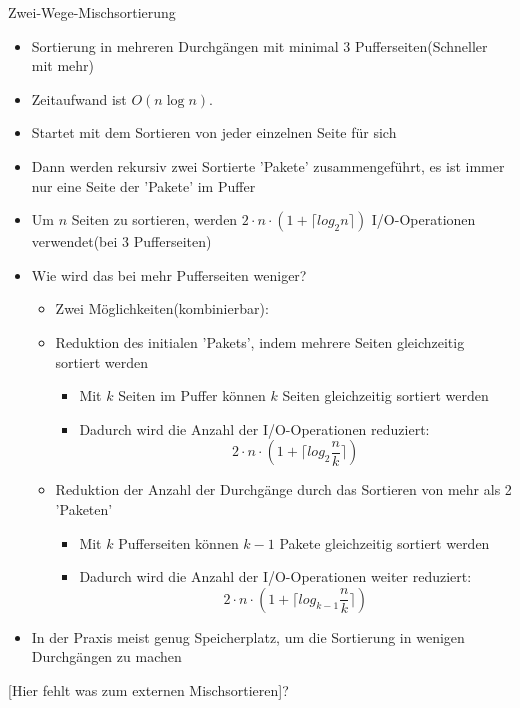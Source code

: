 \documentclass{article}
\begin{document}
\begin{block}{Zwei-Wege-Mischsortierung}
  \begin{itemize}
    \item Sortierung in mehreren Durchgängen mit minimal 3 Pufferseiten(Schneller mit mehr)
    \item Zeitaufwand ist $O(n \log n)$.
    \item Startet mit dem Sortieren von jeder einzelnen Seite für sich
    \item Dann werden rekursiv zwei Sortierte 'Pakete' zusammengeführt, es ist immer nur eine Seite der 'Pakete' im Puffer
    \item Um $n$ Seiten zu sortieren, werden $2 \cdot n \cdot (1 + \lceil log_2n \rceil)$ I/O-Operationen verwendet(bei 3 Pufferseiten)
    \item Wie wird das bei mehr Pufferseiten weniger?
    \begin{itemize}
      \item Zwei Möglichkeiten(kombinierbar):
      \item Reduktion des initialen 'Pakets', indem mehrere Seiten gleichzeitig sortiert werden
      \begin{itemize}
        \item Mit $k$ Seiten im Puffer können $k$ Seiten gleichzeitig sortiert werden
        \item Dadurch wird die Anzahl der I/O-Operationen reduziert:
        \[2 \cdot n \cdot (1 + \lceil log_2\frac{n}{k} \rceil)\]
      \end{itemize}
      \item Reduktion der Anzahl der Durchgänge durch das Sortieren von mehr als 2 'Paketen'
      \begin{itemize}
        \item Mit $k$ Pufferseiten können $k-1$ Pakete gleichzeitig sortiert werden
        \item Dadurch wird die Anzahl der I/O-Operationen weiter reduziert:
        \[2 \cdot n \cdot (1 + \lceil log_{k-1}\frac{n}{k} \rceil)\]
      \end{itemize}
    \end{itemize}
    \item In der Praxis meist genug Speicherplatz, um die Sortierung in wenigen Durchgängen zu machen
  \end{itemize}
\end{block}
[Hier fehlt was zum externen Mischsortieren]?
\end{document}
